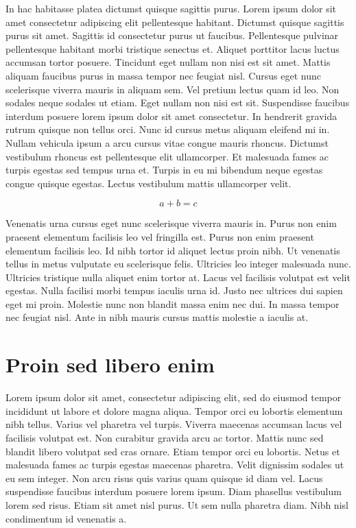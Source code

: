\documentclass[10pt, a4paper]{article}
\numberwithin{equation}{section}
\begin{document}
In hac habitasse platea dictumst quisque sagittis purus. Lorem ipsum dolor sit amet consectetur adipiscing elit pellentesque habitant. Dictumst quisque sagittis purus sit amet. Sagittis id consectetur purus ut faucibus. Pellentesque pulvinar pellentesque habitant morbi tristique senectus et. Aliquet porttitor lacus luctus accumsan tortor posuere. Tincidunt eget nullam non nisi est sit amet. Mattis aliquam faucibus purus in massa tempor nec feugiat nisl. Cursus eget nunc scelerisque viverra mauris in aliquam sem. Vel pretium lectus quam id leo. Non sodales neque sodales ut etiam. Eget nullam non nisi est sit. Suspendisse faucibus interdum posuere lorem ipsum dolor sit amet consectetur. In hendrerit gravida rutrum quisque non tellus orci. Nunc id cursus metus aliquam eleifend mi in. Nullam vehicula ipsum a arcu cursus vitae congue mauris rhoncus. Dictumst vestibulum rhoncus est pellentesque elit ullamcorper. Et malesuada fames ac turpis egestas sed tempus urna et. Turpis in eu mi bibendum neque egestas congue quisque egestas. Lectus vestibulum mattis ullamcorper velit.

\begin{equation}
  a + b = c
\end{equation}

Venenatis urna cursus eget nunc scelerisque viverra mauris in. Purus non enim praesent elementum facilisis leo vel fringilla est. Purus non enim praesent elementum facilisis leo. Id nibh tortor id aliquet lectus proin nibh. Ut venenatis tellus in metus vulputate eu scelerisque felis. Ultricies leo integer malesuada nunc. Ultricies tristique nulla aliquet enim tortor at. Lacus vel facilisis volutpat est velit egestas. Nulla facilisi morbi tempus iaculis urna id. Justo nec ultrices dui sapien eget mi proin. Molestie nunc non blandit massa enim nec dui. In massa tempor nec feugiat nisl. Ante in nibh mauris cursus mattis molestie a iaculis at.


\section{Proin sed libero enim}

Lorem ipsum dolor sit amet, consectetur adipiscing elit, sed do eiusmod tempor incididunt ut labore et dolore magna aliqua. Tempor orci eu lobortis elementum nibh tellus. Varius vel pharetra vel turpis. Viverra maecenas accumsan lacus vel facilisis volutpat est. Non curabitur gravida arcu ac tortor. Mattis nunc sed blandit libero volutpat sed cras ornare. Etiam tempor orci eu lobortis. Netus et malesuada fames ac turpis egestas maecenas pharetra. Velit dignissim sodales ut eu sem integer. Non arcu risus quis varius quam quisque id diam vel. Lacus suspendisse faucibus interdum posuere lorem ipsum. Diam phasellus vestibulum lorem sed risus. Etiam sit amet nisl purus. Ut sem nulla pharetra diam. Nibh nisl condimentum id venenatis a.
\end{document}
